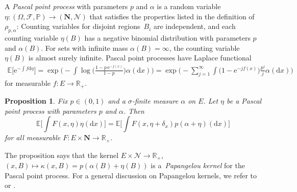 \documentclass[10pt,a4paper]{amsart}
\numberwithin{equation}{section}
\newtheorem{Proposition}[Theorem]{Proposition}
 { \theoremstyle{definition}
\newtheorem{Definition}[Theorem]{Definition}
\newtheorem{Example}[Theorem]{Example}
\newtheorem{Remark}[Theorem]{Remark}
}
\newcommand{\e}{\mathrm{e}} %
\newcommand{\R}{\mathbb{R}}
\renewcommand{\P}{\mathbb{P}}
\newcommand{\E}{\mathbb{E}}
\newcommand{\dd}{\mathrm{d}} %
\newcommand{\1}{\mathbbm{1}}
\begin{document}
A \emph{Pascal point process} with parameters $p$ and $\alpha$ is a random variable $\eta\colon(\Omega,\mathcal F, \P)\to (\mathbf N,\mathcal N)$ that satisfies the properties listed in the definition of $\rho_{p,\alpha}$: Counting variables for disjoint regions~$B_i$ are independent, and each counting variable $\eta(B)$ has a negative binomial distribution with parameters $p$ and $\alpha(B)$. For sets with infinite mass $\alpha(B) = \infty$, the counting variable $\eta(B)$ is almost surely infinite. Pascal point processes have Laplace functional
\begin{gather*}
	\E\bigl[ \e^{-\int f\dd \eta}\bigr] = \exp \biggl(\! - \int \log \biggl(\frac{1- p\,\e^{-f(x)}}{1- p}\biggr) \alpha (\dd x)\biggr) = 	\exp\Biggl(\! - \sum_{j=1}^\infty \int \bigl(1- \e^{- j f(x)}\bigr) \frac{p^j}{j} \alpha(\dd x) \Biggr)
\end{gather*}
for measurable $f \colon E \to \R_+$.

\begin{Proposition}%
	Fix $p\in (0,1)$ and a $\sigma$-finite measure $\alpha$ on $E$. Let $\eta$ be a Pascal point process with parameters $p$ and $\alpha$. Then
	\[
		\E\biggl[ \int F(x,\eta)\eta(\dd x)\biggr] = \E\biggl[\int F(x,\eta+\delta_x) p (\alpha+\eta)(\dd x)\biggr]
	\]
	for all measurable $F\colon E\times \mathbf N \to \R_+$.
\end{Proposition}

The proposition says that the kernel $E\times \mathcal N\to \R_+$, $(x,B)\mapsto \kappa(x,B) = p(\alpha(B) + \eta(B))$ is a~\emph{Papangelou kernel} for the Pascal point process. For a general discussion on Papangelou kernels, we refer to \cite{MatthesWarmuthMecke} or \cite[Section 1.2.2]{Rafler2009}.
\end{document}
